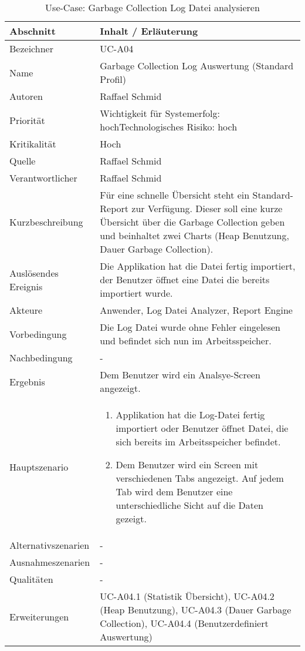 \begin{longtable}{|p{4cm}|p{10.5cm}|}
\caption{Use-Case: Garbage Collection Log Datei analysieren}\\\hline
   \textbf{Abschnitt} & \textbf{Inhalt / Erläuterung} \\\hline
   Bezeichner & UC-A04\\\hline
   Name & Garbage Collection Log Auswertung (Standard Profil)\\\hline
   Autoren & Raffael Schmid\\\hline
   Priorität & Wichtigkeit für Systemerfolg: hoch\newline Technologisches Risiko: hoch\\\hline
   Kritikalität & Hoch\\\hline
   Quelle & Raffael Schmid\\\hline
   Verantwortlicher & Raffael Schmid\\\hline
   Kurzbeschreibung & Für eine schnelle Übersicht steht ein Standard-Report zur Verfügung. Dieser soll eine kurze Übersicht über die Garbage Collection geben und beinhaltet zwei Charts (Heap Benutzung, Dauer Garbage Collection). \\\hline
   Auslösendes Ereignis & Die Applikation hat die Datei fertig importiert, der Benutzer öffnet eine Datei die bereits importiert wurde.\\\hline
   Akteure & Anwender, Log Datei Analyzer, Report Engine\\\hline
   Vorbedingung & Die Log Datei wurde ohne Fehler eingelesen und befindet sich nun im Arbeitsspeicher.\\\hline
   Nachbedingung & -\\\hline
   Ergebnis & Dem Benutzer wird ein Analsye-Screen angezeigt.\\\hline
   Hauptszenario & 
	\begin{enumerate}
		\item Applikation hat die Log-Datei fertig importiert oder Benutzer öffnet Datei, die sich bereits im Arbeitsspeicher befindet.
		\item Dem Benutzer wird ein Screen mit verschiedenen Tabs angezeigt. Auf jedem Tab wird dem Benutzer eine unterschiedliche Sicht auf die Daten gezeigt.
	\end{enumerate}
	\\\hline
   Alternativszenarien & -\\\hline
   Ausnahmeszenarien & -\\\hline
   Qualitäten & -\\\hline
   Erweiterungen & UC-A04.1 (Statistik Übersicht), UC-A04.2 (Heap Benutzung), UC-A04.3 (Dauer Garbage Collection), UC-A04.4 (Benutzerdefiniert Auswertung) \\\hline
\end{longtable}

